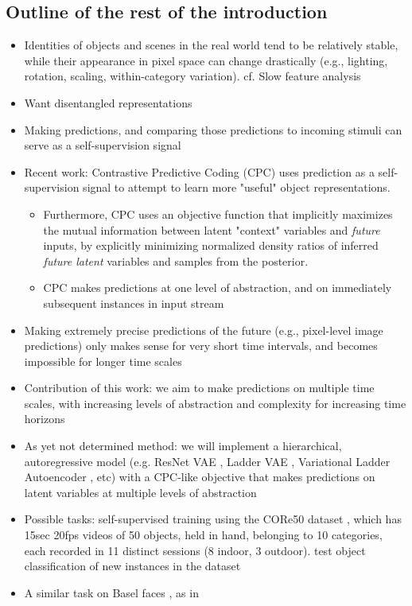 \documentclass{article}
\begin{document}
\subsection*{Outline of the rest of the introduction}
\begin{itemize}
  \item Identities of objects and scenes in the real world tend to be relatively stable, while their appearance in pixel space can change drastically (e.g., lighting, rotation, scaling, within-category variation). cf. Slow feature analysis \cite{Wiskott2002}
  \item Want disentangled representations \cite{DiCarlo2007,Bengio2009,Chen2016,Higgins2017,Alemi2017}
  \item Making predictions, and comparing those predictions to incoming stimuli can serve as a self-supervision signal \cite{Whitney2016,Doersch2015}
  \item Recent work: Contrastive Predictive Coding (CPC) \cite{Oord2018} uses prediction as a self-supervision signal to attempt to learn more "useful" object representations.
  \begin{itemize}
    \item Furthermore, CPC uses an objective function that implicitly maximizes the mutual information between latent "context" variables and \emph{future} inputs, by explicitly minimizing normalized density ratios of inferred \emph{future latent} variables and samples from the posterior.
    \item CPC makes predictions at one level of abstraction, and on immediately subsequent instances in input stream
  \end{itemize}
  \item Making extremely precise predictions of the future (e.g., pixel-level image predictions) only makes sense for very short time intervals, and becomes impossible for longer time scales
  \item Contribution of this work: we aim to make predictions on multiple time scales, with increasing levels of abstraction and complexity for increasing time horizons
  \item As yet not determined method: we will implement a hierarchical, autoregressive model (e.g. ResNet VAE \cite{Kingma2016}, Ladder VAE \cite{Sonderby2016}, Variational Ladder Autoencoder \cite{Zhao2017}, etc) with a CPC-like objective that makes predictions on latent variables at multiple levels of abstraction
  \item Possible tasks: self-supervised training using the CORe50 dataset \cite{Lomonaco2017}, which has 15sec 20fps videos of 50 objects, held in hand, belonging to 10 categories, each recorded in 11 distinct sessions (8 indoor, 3 outdoor). test object classification of new instances in the dataset
  \item A similar task on Basel faces \cite{Paysan2009}, as in \cite{Kulkarni2015,Whitney2016}
\end{itemize}



\end{document}
